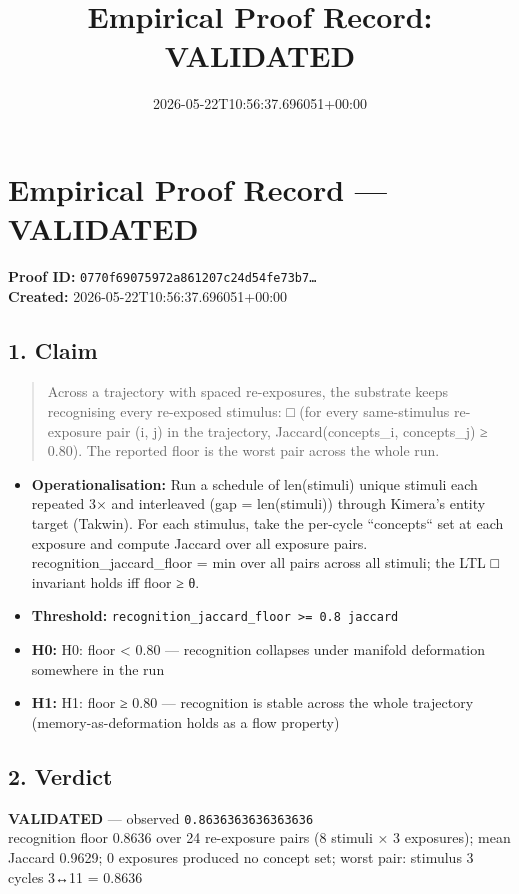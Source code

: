 \documentclass{article}
\title{Empirical Proof Record: VALIDATED}
\date{2026-05-22T10:56:37.696051+00:00}
\begin{document}
\maketitle
\section*{Empirical Proof Record --- \textcolor{validated}{\textbf{VALIDATED}}}
\textbf{Proof ID:} \texttt{0770f69075972a861207c24d54fe73b7\dots}\\
\textbf{Created:} 2026-05-22T10:56:37.696051+00:00
\subsection*{1. Claim}
\begin{quote}Across a trajectory with spaced re-exposures, the substrate keeps recognising every re-exposed stimulus: □ (for every same-stimulus re-exposure pair (i, j) in the trajectory, Jaccard(concepts\_i, concepts\_j) ≥ 0.80). The reported floor is the worst pair across the whole run.\end{quote}
\begin{itemize}
\item \textbf{Operationalisation:} Run a schedule of len(stimuli) unique stimuli each repeated 3× and interleaved (gap = len(stimuli)) through Kimera's entity target (Takwin). For each stimulus, take the per-cycle ``concepts`` set at each exposure and compute Jaccard over all exposure pairs. recognition\_jaccard\_floor = min over all pairs across all stimuli; the LTL □ invariant holds iff floor ≥ θ.
\item \textbf{Threshold:} \texttt{recognition\_jaccard\_floor >= 0.8 jaccard}
\item \textbf{H0:} H0: floor < 0.80 — recognition collapses under manifold deformation somewhere in the run
\item \textbf{H1:} H1: floor ≥ 0.80 — recognition is stable across the whole trajectory (memory-as-deformation holds as a flow property)
\end{itemize}
\subsection*{2. Verdict}
\textcolor{validated}{\textbf{VALIDATED}} --- observed \texttt{0.8636363636363636}\\
recognition floor 0.8636 over 24 re-exposure pairs (8 stimuli × 3 exposures); mean Jaccard 0.9629; 0 exposures produced no concept set; worst pair: stimulus 3 cycles 3↔11 = 0.8636
\end{document}
